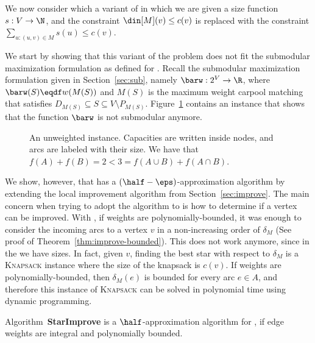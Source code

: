 
We now consider \gcp which a variant of \carpool in which
%
we are given a size function $s:V \to \N$, and the constraint
$\din[M](v) \leq c(v)$ is replaced with the constraint
$\sum_{u:(u,v) \in M} s(u) \leq c(v)$.
%

We start by showing that this variant of the problem does not fit the
submodular maximization formulation as defined for \carpool.
%
Recall the submodular maximization formulation given in
Section~\ref{sec:sub}, namely $\barw: 2^V \to \R$, where
$\barw(S) \eqdf w(M(S))$ and $M(S)$ is the maximum weight carpool
matching that satisfies $D_{M(S)} \subseteq S \subseteq V \setminus
P_{M(S)}$.
%
Figure~\ref{fig:not submodular} contains an instance that shows that
the function $\barw$ is not submodular anymore.

\begin{figure}
\begin{center}
\end{center}
\caption[An unweighted \carpool instance]{
An unweighted \carpool instance.  Capacities are written inside
nodes, and arcs are labeled with their size.  We have that $f(A) +
f(B) = 2 < 3 = f(A \cup B) + f(A \cap B)$.}
\label{fig:not submodular}
\end{figure}

We show, however, that \gcp has a $(\half -\eps)$-approximation
algorithm by extending the local improvement algorithm from
Section~\ref{sec:improve}.
%
The main concern when trying to adopt the algorithm to \gcp is how to
determine if a vertex can be improved.
%
With \carpool, if weights are polynomially-bounded, it was enough to
consider the incoming arcs to a vertex $v$ in a non-increasing
order of $\delta_M$ (See proof of Theorem~\ref{thm:improve-bounded}).
This does not work anymore, since in the \gcp we have sizes.  In fact, given
$v$, finding the best star with respect to $\delta_M$ is
a \textsc{Knapsack} instance where the size of the knapsack is $c(v)$.
%
If weights are polynomially-bounded, then $\delta_M(e)$ is bounded for
every arc $e \in A$, and therefore this instance of \textsc{Knapsack}
can be solved in polynomial time using dynamic programming.

\begin{theorem}
Algorithm~\textbf{StarImprove} is a $\half$-approximation algorithm
for \gcp, if edge weights are integral and polynomially bounded.
\end{theorem}

